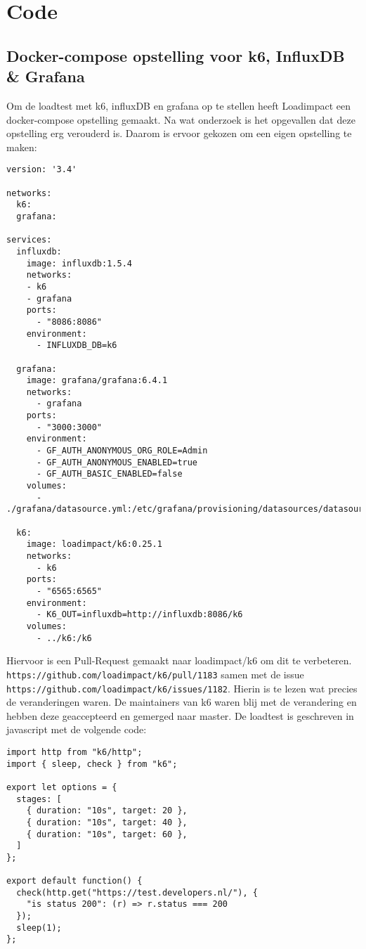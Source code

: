 
\chapter{Code} %

\label{BijlageCode} 

\section{Docker-compose opstelling voor k6, InfluxDB \& Grafana}

\label{Bijlagek6}

Om de loadtest met k6, influxDB en grafana op te stellen heeft Loadimpact een docker-compose opstelling gemaakt. Na wat onderzoek is het opgevallen dat deze opstelling erg verouderd is. Daarom is ervoor gekozen om een eigen opstelling te maken:
\begin{verbatim}
version: '3.4'

networks:
  k6:
  grafana:

services:
  influxdb:
    image: influxdb:1.5.4
    networks:
    - k6
    - grafana
    ports:
      - "8086:8086"
    environment:
      - INFLUXDB_DB=k6
    
  grafana:
    image: grafana/grafana:6.4.1
    networks:
      - grafana
    ports:
      - "3000:3000"
    environment:
      - GF_AUTH_ANONYMOUS_ORG_ROLE=Admin
      - GF_AUTH_ANONYMOUS_ENABLED=true
      - GF_AUTH_BASIC_ENABLED=false
    volumes:
      - ./grafana/datasource.yml:/etc/grafana/provisioning/datasources/datasource.yml
  
  k6:
    image: loadimpact/k6:0.25.1
    networks:
      - k6
    ports:
      - "6565:6565"
    environment:
      - K6_OUT=influxdb=http://influxdb:8086/k6
    volumes:
      - ../k6:/k6
\end{verbatim}

Hiervoor is een Pull-Request gemaakt naar loadimpact/k6 om dit te verbeteren. \texttt{https://github.com/loadimpact/k6/pull/1183} samen met de issue\\ \texttt{https://github.com/loadimpact/k6/issues/1182}. Hierin is te lezen wat precies de veranderingen waren. De maintainers van k6 waren blij met de verandering en hebben deze geaccepteerd en gemerged naar master. De loadtest is geschreven in javascript met de volgende code:
\begin{verbatim}
import http from "k6/http";
import { sleep, check } from "k6";

export let options = {
  stages: [
    { duration: "10s", target: 20 },
    { duration: "10s", target: 40 },
    { duration: "10s", target: 60 },
  ]
};

export default function() {
  check(http.get("https://test.developers.nl/"), {
    "is status 200": (r) => r.status === 200
  });
  sleep(1);
};
\end{verbatim}

